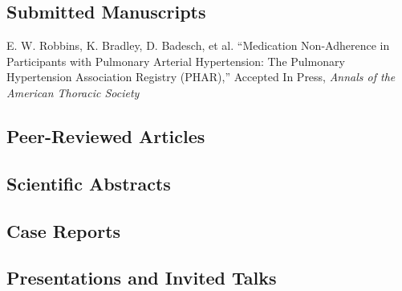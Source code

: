 \documentclass{article}
\newcommand\colleft{.20}
\newcommand\colright{.75}
\newcommand{\entryfour}[4]
	{
		\begin{minipage}[t]{\colleft\textwidth}
		\hfill \textsc{#1}
		\end{minipage}
		\hfill\vline\hfill
		\begin{minipage}[t]{\colright\textwidth}
		{\bf#2}\\
		\textit{#3}
		\footnotesize{#4}
		\end{minipage}\\
		\entryvspace
	}%
\newcommand{\entryvspace}{\vspace{0.5em}}
\begin{document}
	\subsection*{Submitted Manuscripts}
		E. W. Robbins, K. Bradley, D. Badesch, et al. ``Medication Non-Adherence in Participants with Pulmonary Arterial Hypertension: The Pulmonary Hypertension Association Registry (PHAR),'' Accepted In Press, \emph{Annals of the American Thoracic Society}
	\subsection*{Peer-Reviewed Articles}
		\printbibliography[keyword=article, heading=none]
	\subsection*{Scientific Abstracts}
		\printbibliography[keyword=abstract, heading=none,resetnumbers]	
	\subsection*{Case Reports}
		\printbibliography[keyword=caseRep, heading=none,resetnumbers]
  \subsection*{Presentations and Invited Talks}
	  \printbibliography[keyword=presentation, heading=none, resetnumbers]
	
	
\end{document}
